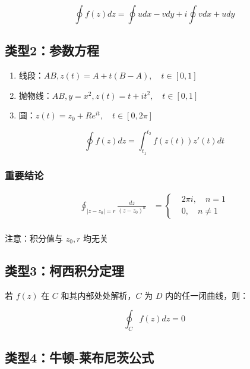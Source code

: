 \documentclass{article}
\begin{document}
\begin{equation}
    \oint  f(z) dz = \oint u dx - v dy + i \oint v dx + u dy
\end{equation}

\subsection{类型2：参数方程}

\begin{enumerate}
    \item 线段：$AB, z(t)=A+t(B-A), \quad t \in [0,1]$
    \item 抛物线：$AB,y=x^2,z(t)=t+it^2, \quad t \in [0,1]$
    \item 圆：$z(t)=z_0+R e^{it}, \quad t \in [0,2\pi]$
\end{enumerate}

\begin{equation}
    \oint f(z) dz = \int_{t_1}^{t_2} f(z(t)) z'(t) dt
\end{equation}

\subsubsection{重要结论}

\begin{equation}
    \begin{aligned}
        \oint_{|z-z_0|=r} \frac{dz}{(z-z_0)^n} &= \left\{
            \begin{aligned}
                &2\pi i, \quad n=1 \\
                &0, \quad n \neq 1
            \end{aligned}
        \right. \\
    \end{aligned}
\end{equation}

注意：积分值与 $z_0,r$ 均无关

\subsection{类型3：柯西积分定理}

若 $f(z)$ 在 $C$ 和其内部处处解析，$C$ 为 $D$ 内的任一闭曲线，则：

\begin{equation}
    \oint_C f(z) dz = 0
\end{equation}

\subsection{类型4：牛顿-莱布尼茨公式}
\end{document}
